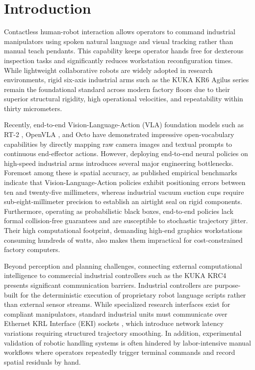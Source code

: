 \documentclass{svproc}
\begin{document}
\section{Introduction}
\label{sec:introduction}

Contactless human-robot interaction allows operators to command industrial manipulators using spoken natural language and visual tracking rather than manual teach pendants. This capability keeps operator hands free for dexterous inspection tasks and significantly reduces workstation reconfiguration times. While lightweight collaborative robots are widely adopted in research environments, rigid six-axis industrial arms such as the KUKA KR6 Agilus series remain the foundational standard across modern factory floors due to their superior structural rigidity, high operational velocities, and repeatability within thirty micrometers.

Recently, end-to-end Vision-Language-Action (VLA) foundation models such as RT-2 \cite{rt2_2023}, OpenVLA \cite{openvla2024}, and Octo \cite{octo2024} have demonstrated impressive open-vocabulary capabilities by directly mapping raw camera images and textual prompts to continuous end-effector actions. However, deploying end-to-end neural policies on high-speed industrial arms introduces several major engineering bottlenecks. Foremost among these is spatial accuracy, as published empirical benchmarks indicate that Vision-Language-Action policies exhibit positioning errors between ten and twenty-five millimeters, whereas industrial vacuum suction cups require sub-eight-millimeter precision to establish an airtight seal on rigid components. Furthermore, operating as probabilistic black boxes, end-to-end policies lack formal collision-free guarantees and are susceptible to stochastic trajectory jitter. Their high computational footprint, demanding high-end graphics workstations consuming hundreds of watts, also makes them impractical for cost-constrained factory computers.

Beyond perception and planning challenges, connecting external computational intelligence to commercial industrial controllers such as the KUKA KRC4 \cite{kuka_kss2018} presents significant communication barriers. Industrial controllers are purpose-built for the deterministic execution of proprietary robot language scripts rather than external sensor streams. While specialized research interfaces exist for compliant manipulators, standard industrial units must communicate over Ethernet KRL Interface (EKI) sockets \cite{kuka_eki_eval2022}, which introduce network latency variations requiring structured trajectory smoothing. In addition, experimental validation of robotic handling systems is often hindered by labor-intensive manual workflows where operators repeatedly trigger terminal commands and record spatial residuals by hand.
\end{document}
